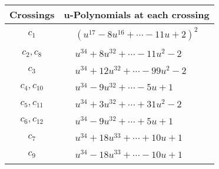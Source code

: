 \documentclass[1p]{elsarticle_modified}
\theoremstyle{definition}
\begin{document}
\begin{tabular}{m{50pt}|m{274pt}}
Crossings & \hspace{64pt}u-Polynomials at each crossing \\
\hline $$\begin{aligned}c_{1}\end{aligned}$$&$\begin{aligned}
&(u^{17}-8 u^{16}+\cdots-11 u+2)^{2}
\end{aligned}$\\
\hline $$\begin{aligned}c_{2},c_{8}\end{aligned}$$&$\begin{aligned}
&u^{34}+8 u^{32}+\cdots-11 u^2-2
\end{aligned}$\\
\hline $$\begin{aligned}c_{3}\end{aligned}$$&$\begin{aligned}
&u^{34}+12 u^{32}+\cdots-99 u^2-2
\end{aligned}$\\
\hline $$\begin{aligned}c_{4},c_{10}\end{aligned}$$&$\begin{aligned}
&u^{34}-9 u^{32}+\cdots-5 u+1
\end{aligned}$\\
\hline $$\begin{aligned}c_{5},c_{11}\end{aligned}$$&$\begin{aligned}
&u^{34}+3 u^{32}+\cdots+31 u^2-2
\end{aligned}$\\
\hline $$\begin{aligned}c_{6},c_{12}\end{aligned}$$&$\begin{aligned}
&u^{34}-9 u^{32}+\cdots+5 u+1
\end{aligned}$\\
\hline $$\begin{aligned}c_{7}\end{aligned}$$&$\begin{aligned}
&u^{34}+18 u^{33}+\cdots+10 u+1
\end{aligned}$\\
\hline $$\begin{aligned}c_{9}\end{aligned}$$&$\begin{aligned}
&u^{34}-18 u^{33}+\cdots-10 u+1
\end{aligned}$\\
\hline
\end{tabular}\\~\\
\end{document}
